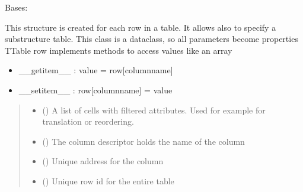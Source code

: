 \documentclass[letterpaper,10pt,english]{sphinxmanual}
\begin{document}
\begin{savenotes}\begin{fulllineitems}
\label{\detokenize{eezz:eezz.table.TTableRow}}
\pysigstartsignatures
{}
\pysigstopsignatures
\sphinxAtStartPar
Bases: 

\sphinxAtStartPar
This structure is created for each row in a table. It allows also to specify a sub\sphinxhyphen{}structure table.
This class is a dataclass, so all parameters become properties
TTable row implements methods to access values like an array
\begin{itemize}
\item {} 
\sphinxAtStartPar
\_\_getitem\_\_ : value = row{[}column\sphinxhyphen{}name{]}

\item {} 
\sphinxAtStartPar
\_\_setitem\_\_ : row{[}column\sphinxhyphen{}name{]} = value

\end{itemize}
\begin{quote}\begin{description}
\begin{itemize}
\item {} 
\sphinxAtStartPar
{} (\sphinxstyleliteralemphasis{\sphinxupquote{{[}}}\sphinxstyleliteralemphasis{\sphinxupquote{{]}}}) \textendash{} A list of cells with filtered attributes. Used for example for translation or re\sphinxhyphen{}ordering.

\item {} 
\sphinxAtStartPar
{} (\sphinxstyleliteralemphasis{\sphinxupquote{{[}}}\sphinxstyleliteralemphasis{\sphinxupquote{{]}}}) \textendash{} The column descriptor holds the name of the column

\item {} 
\sphinxAtStartPar
{} () \textendash{} Unique address for the column

\item {} 
\sphinxAtStartPar
{} () \textendash{} Unique row id for the entire table


\end{itemize}
\end{description}
\end{quote}
\end{fulllineitems}
\end{savenotes}
\end{document}

